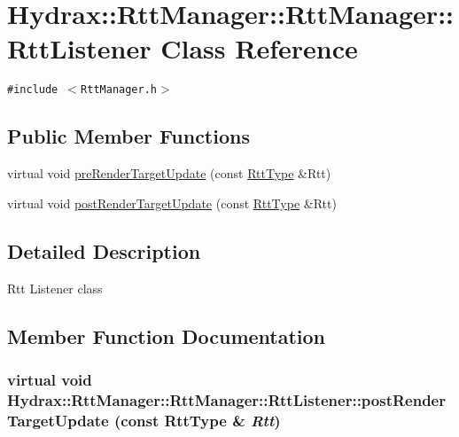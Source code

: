 \hypertarget{class_hydrax_1_1_rtt_manager_1_1_rtt_listener}{
\section{Hydrax::RttManager::RttManager::RttListener Class Reference}
\label{class_hydrax_1_1_rtt_manager_1_1_rtt_listener}
}
{\tt \#include $<$RttManager.h$>$}

\subsection*{Public Member Functions}
\begin{CompactItemize}
\item 
virtual void \hyperlink{class_hydrax_1_1_rtt_manager_1_1_rtt_listener_64191ee4842c729d3936409280bb05cf}{preRenderTargetUpdate} (const \hyperlink{class_hydrax_1_1_rtt_manager_9753d012b355eba64cff2b19bb6f76ed}{RttType} \&Rtt)
\item 
virtual void \hyperlink{class_hydrax_1_1_rtt_manager_1_1_rtt_listener_546384571cb09917b13a0882242b48c7}{postRenderTargetUpdate} (const \hyperlink{class_hydrax_1_1_rtt_manager_9753d012b355eba64cff2b19bb6f76ed}{RttType} \&Rtt)
\end{CompactItemize}


\subsection{Detailed Description}
Rtt Listener class 

\subsection{Member Function Documentation}
\hypertarget{class_hydrax_1_1_rtt_manager_1_1_rtt_listener_546384571cb09917b13a0882242b48c7}{
\subsubsection[{postRenderTargetUpdate}]{\setlength{\rightskip}{0pt plus 5cm}virtual void Hydrax::RttManager::RttManager::RttListener::postRenderTargetUpdate (const {\bf RttType} \& {\em Rtt})}}
\label{class_hydrax_1_1_rtt_manager_1_1_rtt_listener_546384571cb09917b13a0882242b48c7}


